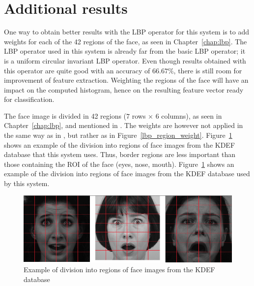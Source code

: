 \section{Additional results}

\vspace{\baselineskip}
\noindent One way to obtain better results with the LBP operator for this system is to add weights for each of the 42 regions of the face, as seen in Chapter~\ref{chap:lbp}. The LBP operator used in this system is already far from the basic LBP operator; it is a uniform circular invariant LBP operator. Even though results obtained with this operator are quite good with an accuracy of $ 66.67\% $, there is still room for improvement of feature extraction. Weighting the regions of the face will have an impact on the computed histogram, hence on the resulting feature vector ready for classification. \newline

\noindent The face image is divided in 42 regions ($ 7 $ rows $\times$ $ 6 $ columns), as seen in Chapter~\ref{chap:lbp}, and mentioned in \cite{GAN08}. The weights are however not applied in the same way as in \cite{GAN08}, but rather as in Figure~\ref{lbp_region_weight}. Figure~\ref{implementation_weight_example} shows an example of the division into regions of face images from the KDEF database that this system uses. Thus, border regions are less important than those containing the ROI of the face (eyes, nose, mouth). Figure~\ref{implementation_weight_example} shows an example of the division into regions of face images from the KDEF database used by this system.
\newline

\begin{figure}[!h]
\begin{center}
\noindent \includegraphics[scale=0.3]{figures/implementation_weight_example} 
\newline
\caption{Example of division into regions of face images from the KDEF database}
\label{implementation_weight_example}
\end{center} 
\end{figure}

